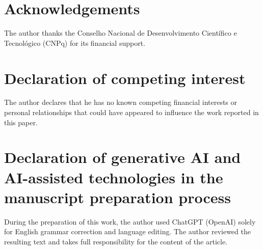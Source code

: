 \documentclass[10pt]{amsart}
\theoremstyle{definition}
\theoremstyle{remark}
\numberwithin{equation}{section}
\begin{document}
\section*{Acknowledgements}

The author thanks the Conselho Nacional de Desenvolvimento Cient\'ifico e
Tecnol\'ogico (CNPq) for its financial support.

\section*{Declaration of competing interest}

The author declares that he has no known competing financial interests or
personal relationships that could have appeared to influence the work
reported in this paper.

\section*{Declaration of generative AI and AI-assisted technologies
in the manuscript preparation process}

During the preparation of this work, the author used ChatGPT (OpenAI) solely for English grammar correction and language editing. The author reviewed the resulting text and takes full responsibility for the content of the article.
\end{document}
